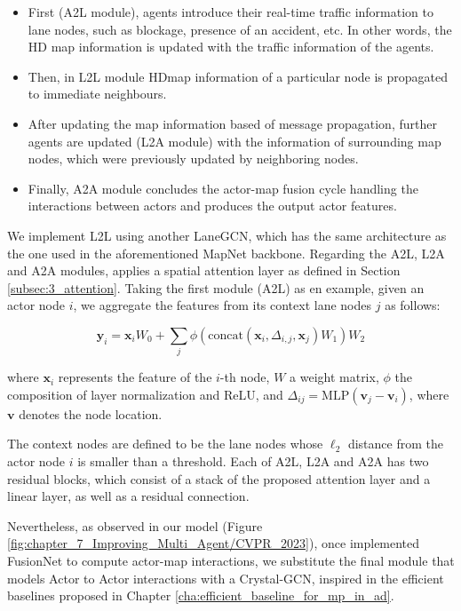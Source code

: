 \begin{itemize}
	
	\item First (A2L module), agents introduce their real-time traffic information to lane nodes, such as blockage, presence of an accident, etc. In other words, the HD map information is updated with the traffic information of the agents.
	
	\item Then, in L2L module \ac{HDmap} information of a particular node is propagated to immediate neighbours.
	
	\item After updating the map information based of message propagation, further agents are updated (L2A module) with the information of surrounding map nodes, which were previously updated by neighboring nodes.
	
	\item Finally, A2A module concludes the actor-map fusion cycle handling the interactions between actors and produces the output actor features.
	
\end{itemize}

We implement L2L using another LaneGCN, which has the same architecture as the one used in the aforementioned MapNet backbone. Regarding the A2L, L2A and A2A modules, \cite{liang2020learning} applies a spatial attention layer as defined in Section \ref{subsec:3_attention}. Taking the first module (A2L) as en example, given an actor node $i$, we aggregate the features from its context lane nodes $j$ as follows:

\begin{equation}
	\mathbf{y}_i = \mathbf{x}_i W_0 + \sum_j \phi ( \text{concat} (\mathbf{x}_i, \Delta_{i,j}, \mathbf{x}_j) W_1) W_2
	\label{equ:attention}
\end{equation}

where $\mathbf{x}_i$ represents the feature of the $i$-th node, $W$ a weight matrix, $\phi$ the composition of layer normalization and ReLU, and $\Delta_{ij} = \text{MLP}(\mathbf{v}_j - \mathbf{v}_i)$, where $\mathbf{v}$ denotes the node location.

The context nodes are defined to be the lane nodes whose $\ell_2$ distance from the actor node $i$ is smaller than a threshold. Each of A2L, L2A and A2A has two residual blocks, which consist of a stack of the proposed attention layer and a linear layer, as well as a residual connection. 

Nevertheless, as observed in our model (Figure \ref{fig:chapter_7_Improving_Multi_Agent/CVPR_2023}), once implemented FusionNet to compute actor-map interactions, we substitute the final module that models Actor to Actor interactions with a Crystal-\ac{GCN}, inspired in the efficient baselines proposed in Chapter \ref{cha:efficient_baseline_for_mp_in_ad}. %


